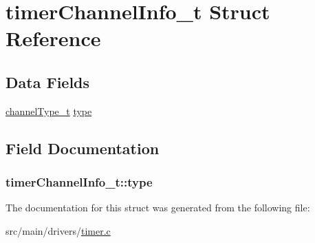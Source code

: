 \hypertarget{structtimerChannelInfo__t}{\section{timer\+Channel\+Info\+\_\+t Struct Reference}
\label{structtimerChannelInfo__t}
}
\subsection*{Data Fields}
\begin{DoxyCompactItemize}
\item 
\hyperlink{timer_8h_a38e966a90c31ad5aa3991223594d4e1e}{channel\+Type\+\_\+t} \hyperlink{structtimerChannelInfo__t_ac7f38a45a3f8923add294107f1e17031}{type}
\end{DoxyCompactItemize}


\subsection{Field Documentation}
\hypertarget{structtimerChannelInfo__t_ac7f38a45a3f8923add294107f1e17031}{
\subsubsection[{type}]{ timer\+Channel\+Info\+\_\+t\+::type}}\label{structtimerChannelInfo__t_ac7f38a45a3f8923add294107f1e17031}


The documentation for this struct was generated from the following file\+:\begin{DoxyCompactItemize}
\item 
src/main/drivers/\hyperlink{timer_8c}{timer.\+c}\end{DoxyCompactItemize}
